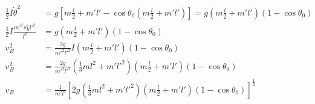 \documentclass[]{article}
\begin{document}
	\begin{equation}
		\begin{split}
			\frac{1}{2} I \dot{\theta}^2 &= g \left[ m \frac{l}{2} + m'l' - \cos \theta_0 \left( m \frac{l}{2} + m' l' \right)  \right] = g \left( m \frac{l}{2} + m'l' \right) \left( 1 - \cos \theta_0 \right) \\
			\frac{1}{2} I \frac{m'^2 v^2_B l'^2}{I^2} &= g \left( m \frac{l}{2} + m'l' \right) \left( 1 - \cos \theta_0 \right) \\
			v^2_B &= \frac{2g}{m'^2 l'^2} I \left( m \frac{l}{2} + m'l' \right) \left( 1 - \cos \theta_0 \right) \\
			v^2_B &= \frac{2g}{m'^2 l'^2} \left( \frac{1}{3}ml^2 + m' l'^2 \right) \left( m \frac{l}{2} + m'l' \right) \left( 1 - \cos \theta_0 \right) \\
			v_B &= \frac{1}{m' l'} \left[ 2g \left( \frac{1}{3}ml^2 + m' l'^2 \right) \left( m \frac{l}{2} + m'l' \right) \left( 1 - \cos \theta_0 \right) \right]^{\frac{1}{2}} \\
		\end{split}
	\end{equation}
	
\end{document}
